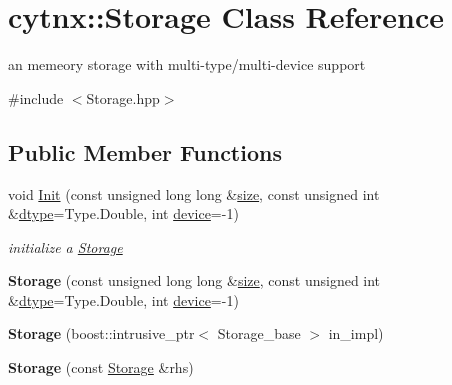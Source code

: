 \hypertarget{classcytnx_1_1Storage}{}\section{cytnx\+:\+:Storage Class Reference}
\label{classcytnx_1_1Storage}


an memeory storage with multi-\/type/multi-\/device support  




{\ttfamily \#include $<$Storage.\+hpp$>$}

\subsection*{Public Member Functions}
\begin{DoxyCompactItemize}
\item 
void \hyperlink{classcytnx_1_1Storage_a6cf79f362c4ae68ab7623f0ebac9355e}{Init} (const unsigned long long \&\hyperlink{classcytnx_1_1Storage_aaf36262622abdab03c90b713c454f78e}{size}, const unsigned int \&\hyperlink{classcytnx_1_1Storage_a643824801e81ab86aca055f1dd1f34d7}{dtype}=Type.\+Double, int \hyperlink{classcytnx_1_1Storage_a4c3e27582d7f951e6b76ccbb92f7c537}{device}=-\/1)
\begin{DoxyCompactList}\small\item\em initialize a \hyperlink{classcytnx_1_1Storage}{Storage} \end{DoxyCompactList}\item 
\mbox{\label{classcytnx_1_1Storage_a281c06bd64e9ea3338083c18c4c32eda}} 
{\bfseries Storage} (const unsigned long long \&\hyperlink{classcytnx_1_1Storage_aaf36262622abdab03c90b713c454f78e}{size}, const unsigned int \&\hyperlink{classcytnx_1_1Storage_a643824801e81ab86aca055f1dd1f34d7}{dtype}=Type.\+Double, int \hyperlink{classcytnx_1_1Storage_a4c3e27582d7f951e6b76ccbb92f7c537}{device}=-\/1)
\item 
\mbox{\label{classcytnx_1_1Storage_ab602ecd72e5fc4224922a6b6212ff120}} 
{\bfseries Storage} (boost\+::intrusive\+\_\+ptr$<$ Storage\+\_\+base $>$ in\+\_\+impl)
\item 
\mbox{\label{classcytnx_1_1Storage_a095c6d65c93d237ad4d94cf241b1555e}} 
{\bfseries Storage} (const \hyperlink{classcytnx_1_1Storage}{Storage} \&rhs)
\item 

\end{DoxyCompactItemize}
